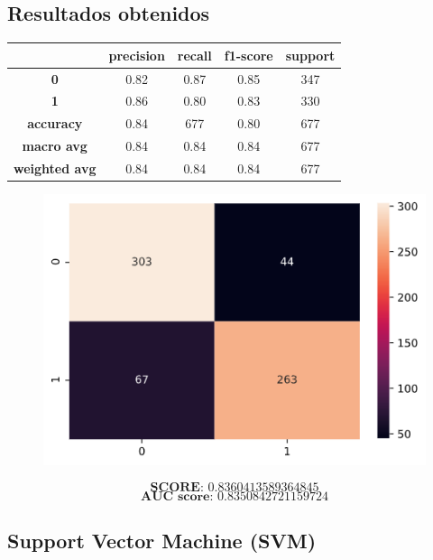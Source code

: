 \documentclass[11pt,a4paper]{article}
\begin{document}
\subsection*{Resultados obtenidos}
\begin{table}[H]
    \centering
    \begin{tabular}{c|cccc}
        \textbf{} & \textbf{precision} & \textbf{recall} & \textbf{f1-score} & \textbf{support} \\ \hline
        \textbf{0} & 0.82 & 0.87 & 0.85 & 347 \\
        \textbf{1} & 0.86 & 0.80 & 0.83 & 330 \\ \hline
        \textbf{accuracy} & 0.84 & 677 & 0.80 & 677 \\
        \textbf{macro avg} & 0.84 & 0.84 & 0.84 & 677 \\
        \textbf{weighted avg} & 0.84 & 0.84 & 0.84 & 677
    \end{tabular}
\end{table}

\begin{figure}[H]
    \centering
    \includegraphics[scale=0.5]{img/matrix-neuralnetwork.png}    
\end{figure}
$$\textbf{SCORE:  } 0.8360413589364845$$
$$\textbf{AUC score:  } 0.8350842721159724$$

\subsection{Support Vector Machine (SVM)}
\end{document}
